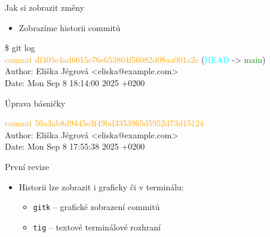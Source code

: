 \documentclass{beamer}
\begin{document}
\begin{frame}[fragile]{Jak si zobrazit změny}
	
	\begin{itemize}
		\item Zobrazíme historii commitů
	\end{itemize}
	
	{\ttfamily\small
		\$ git log \\
		
		\textcolor{orange}{commit} \textcolor{orange}{df405e4ad6615c76e653804f56082d08aa001a2e} (\textcolor{cyan}{HEAD} -> \textcolor{green}{main}) \\
		Author: Eliška Jégrová <eliska@example.com> \\
		Date:   Mon Sep 8 18:14:00 2025 +0200
		
		Úprava básničky
		
		\textcolor{orange}{commit} \textcolor{orange}{50a3ab8d9445e3f49bd3353965d5952d73d15124} \\
		Author: Eliška Jégrová <eliska@example.com> \\
		Date:   Mon Sep 8 17:55:38 2025 +0200
		
		První revize
	}
	
	
	\hspace{0.5cm}
	\begin{itemize}
		\item Historii lze zobrazit i graficky či v terminálu:
		\begin{itemize}
			\item \texttt{gitk} – grafické zobrazení commitů
			\item \texttt{tig} – textové terminálové rozhraní
		\end{itemize}
	\end{itemize}
	
\end{frame}
\end{document}
